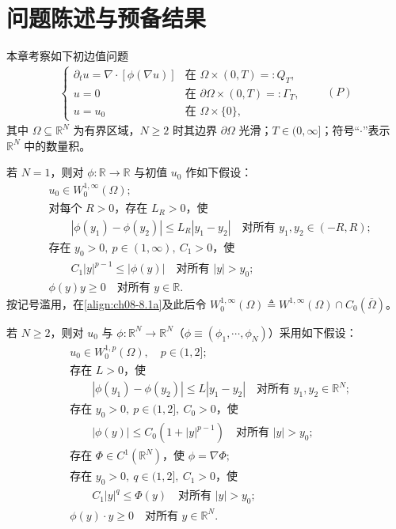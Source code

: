 \documentclass[../../main.tex]{subfiles}%
\begin{document}
\section{问题陈述与预备结果}\label{section:ch08-问题陈述}

本章考察如下初边值问题
\begin{align*}
\begin{cases}
\partial_t u=\nabla\cdot[\phi(\nabla u)] & \text{在 }\Omega\times(0,T)=:Q_T,\\
u=0 & \text{在 }\partial\Omega\times(0,T)=:\Gamma_T,\\
u=u_0 & \text{在 }\Omega\times\{0\},
\end{cases}
\qquad(P)
\end{align*}
其中 $\Omega\subseteq\mathbb{R}^N$ 为有界区域，$N\geqslant2$ 时其边界 $\partial\Omega$ 光滑；$T\in(0,\infty]$；符号“$\cdot$”表示 $\mathbb{R}^N$ 中的数量积。

若 $N=1$，则对 $\phi:\mathbb{R}\to\mathbb{R}$ 与初值 $u_0$ 作如下假设：
\begin{align}
&u_0\in W^{1,\infty}_0(\Omega); \label{align:ch08-8.1a}\\
&\text{对每个 }R>0\text{，存在 }L_R>0\text{，使}\nonumber\\
&\qquad |\phi(y_1)-\phi(y_2)|\leqslant L_R|y_1-y_2|
\quad\text{对所有 }y_1,y_2\in(-R,R); \label{align:ch08-8.1b}\\
&\text{存在 }y_0>0,\ p\in(1,\infty),\ C_1>0\text{，使}\nonumber\\
&\qquad C_1|y|^{p-1}\leqslant|\phi(y)|
\quad\text{对所有 }|y|>y_0; \label{align:ch08-8.1c}\\
&\phi(y)y\geqslant0\quad\text{对所有 }y\in\mathbb{R}. \label{align:ch08-8.1d}
\end{align}
按记号滥用，在\eqref{align:ch08-8.1a}及此后令 $W^{1,\infty}_0(\Omega)\triangleq W^{1,\infty}(\Omega)\cap C_0(\overline\Omega)$。

若 $N\geqslant2$，则对 $u_0$ 与 $\phi:\mathbb{R}^N\to\mathbb{R}^N$（$\phi\equiv(\phi_1,\cdots ,\phi_N)$）采用如下假设：
\begin{align}
&u_0\in W^{1,p}_0(\Omega),\quad p\in(1,2]; \label{align:ch08-8.2a}\\
&\text{存在 }L>0\text{，使}\nonumber\\
&\qquad |\phi(y_1)-\phi(y_2)|\leqslant L|y_1-y_2|
\quad\text{对所有 }y_1,y_2\in\mathbb{R}^N; \label{align:ch08-8.2b}\\
&\text{存在 }y_0>0,\ p\in(1,2],\ C_0>0\text{，使}\nonumber\\
&\qquad |\phi(y)|\leqslant C_0(1+|y|^{p-1})
\quad\text{对所有 }|y|>y_0; \label{align:ch08-8.2c}\\
&\text{存在 }\Phi\in C^1(\mathbb{R}^N)\text{，使 }\phi=\nabla\Phi; \label{align:ch08-8.2d}\\
&\text{存在 }y_0>0,\ q\in(1,2],\ C_1>0\text{，使}\nonumber\\
&\qquad C_1|y|^q\leqslant\Phi(y)
\quad\text{对所有 }|y|>y_0; \label{align:ch08-8.2e}\\
&\phi(y)\cdot y\geqslant0\quad\text{对所有 }y\in\mathbb{R}^N. \label{align:ch08-8.2f}
\end{align}
\end{document}
